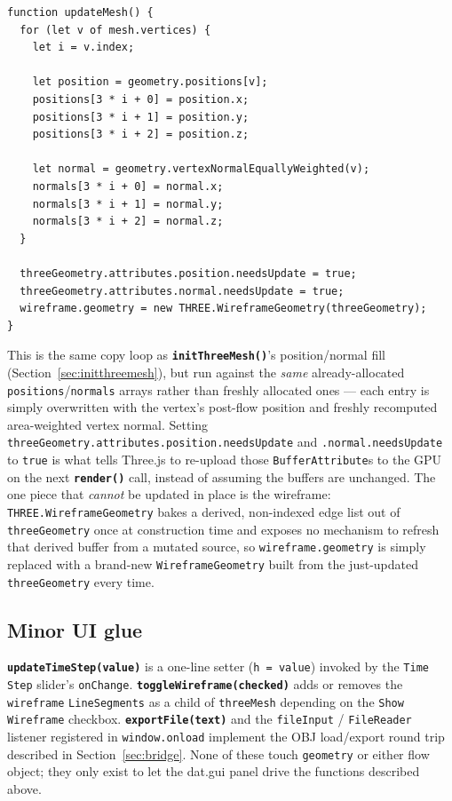 \documentclass[11pt]{article}
\newcommand{\code}[1]{\texttt{#1}}
\newcommand{\func}[1]{\texttt{\textbf{#1}}}
\begin{document}
\begin{lstlisting}
function updateMesh() {
  for (let v of mesh.vertices) {
    let i = v.index;

    let position = geometry.positions[v];
    positions[3 * i + 0] = position.x;
    positions[3 * i + 1] = position.y;
    positions[3 * i + 2] = position.z;

    let normal = geometry.vertexNormalEquallyWeighted(v);
    normals[3 * i + 0] = normal.x;
    normals[3 * i + 1] = normal.y;
    normals[3 * i + 2] = normal.z;
  }

  threeGeometry.attributes.position.needsUpdate = true;
  threeGeometry.attributes.normal.needsUpdate = true;
  wireframe.geometry = new THREE.WireframeGeometry(threeGeometry);
}
\end{lstlisting}
This is the same copy loop as \func{initThreeMesh()}'s position/normal fill
(Section~\ref{sec:initthreemesh}), but run against the \emph{same} already-allocated
\code{positions}/\code{normals} arrays rather than freshly allocated ones --- each entry is
simply overwritten with the vertex's post-flow position and freshly recomputed
area-weighted vertex normal. Setting \code{threeGeometry.attributes.position.needsUpdate}
and \code{.normal.needsUpdate} to \code{true} is what tells Three.js to re-upload those
\code{BufferAttribute}s to the GPU on the next \func{render()} call, instead of assuming
the buffers are unchanged. The one piece that \emph{cannot} be updated in place is the
wireframe: \code{THREE.WireframeGeometry} bakes a derived, non-indexed edge list out of
\code{threeGeometry} once at construction time and exposes no mechanism to refresh that
derived buffer from a mutated source, so \code{wireframe.geometry} is simply replaced with
a brand-new \code{WireframeGeometry} built from the just-updated \code{threeGeometry} every
time.

\subsection{Minor UI glue}
\func{updateTimeStep(value)} is a one-line setter (\code{h = value}) invoked by the
\code{Time Step} slider's \code{onChange}. \func{toggleWireframe(checked)} adds or removes
the \code{wireframe} \code{LineSegments} as a child of \code{threeMesh} depending on the
\code{Show Wireframe} checkbox. \func{exportFile(text)} and the \code{fileInput} /
\code{FileReader} listener registered in \code{window.onload} implement the OBJ
load/export round trip described in Section~\ref{sec:bridge}. None of these touch
\code{geometry} or either flow object; they only exist to let the dat.gui panel drive the
functions described above.
\end{document}
